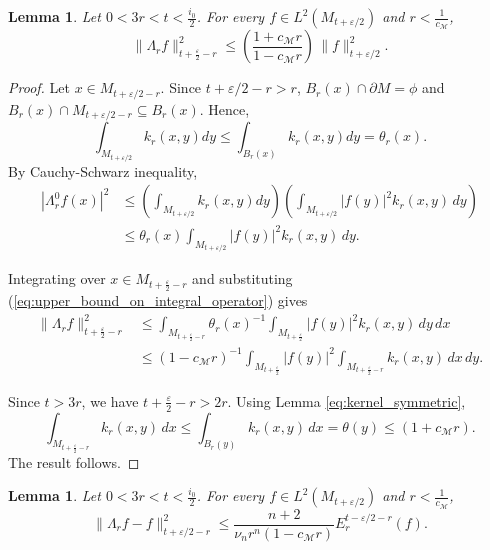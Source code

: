 \documentclass[10 pt, reqno]{amsart}
\newcommand{\M}{\mathcal{M}}
\newtheorem{lemma}[theorem]{Lemma}
\theoremstyle{definition}
\numberwithin{equation}{section}
\newcommand{\MMM}{\mathcal{M}}
\newcommand{\lbtheta}{(1-c_\MMM r)}
\begin{document}
\begin{lemma}\label{lem:L2-stability-Mrho}
Let $0<3r<t<\frac{i_0}{2}$. For every $f\in L^2(M_{t+\varepsilon/2})$ and $r<\frac{1}{c_\M}$,
\[
\|\Lambda_r f\|^2_{t+\frac{\varepsilon}{2}-r}
\le
\left( \frac{1+c_\MMM r}{1-c_\MMM r}\right)\,\|f\|^2_{t+\varepsilon/2}.
\]
\end{lemma}
\begin{proof}
Let $x\in M_{t+\varepsilon/2-r}.$ Since $t+\varepsilon/2-r>r$, $B_r(x)\cap \partial M=\phi$ and $B_r(x)\cap M_{t+\varepsilon/2-r}\subseteq B_r(x).$ Hence,
\[\int_{M_{t+\varepsilon/2}}k_r(x,y)dy\le \int_{B_r(x)}k_r(x,y)dy=\theta_r(x).\]
By Cauchy-Schwarz inequality,
\begin{align} 
|\Lambda^0_r f(x)|^2 &\le \left(\int_{M_{t+\varepsilon/2}}k_r(x,y)dy\right)\left(\int_{M_{t+\varepsilon/2}} |f(y)|^2 k_r(x,y)\,dy\right)\nonumber\\ &\le\theta_r(x)\int_{M_{t+\varepsilon/2}} |f(y)|^2 k_r(x,y)\,dy.\label{eq:upper_bound_on_integral_operator}
\end{align}

Integrating over $x\in M_{t+\frac{\varepsilon}{2}-r}$  and substituting (\ref{eq:upper_bound_on_integral_operator}) gives
\begin{align}
  \|\Lambda_r f\|_{t+\frac{\varepsilon}{2}-r}^2
&\le \int_{M_{t+\frac{\varepsilon}{2}-r}}\theta_r(x)^{-1}
\int_{M_{t+\frac{\varepsilon}{2}}}|f(y)|^2
k_r(x,y)\,dy\,dx \nonumber\\ 
&\le (1-c_\M r)^{-1}\int_{M_{t+\frac{\varepsilon}{2}}}|f(y)|^2
\int_{M_{t+\frac{\varepsilon}{2}-r}}
k_r(x,y)\,dx\,dy.\nonumber  
\end{align}

Since $t>3r$, we have $t+\frac{\varepsilon}{2}-r>2r$. Using Lemma \ref{eq:kernel_symmetric}, 
\[
\int_{M_{t+\frac{\varepsilon}{2}-r}}
k_r(x,y)\,dx\le \int_{B_r(y)}
k_r(x,y)\,dx=\theta(y)\le (1+c_\M r).
\]
The result follows.
\end{proof}
\begin{lemma}\label{lem:smoothing-error-Mrho}
Let $0<3r<t<\frac{i_0}{2}$. For every $f\in L^2(M_{t+\varepsilon/2})$ and $r<\frac{1}{c_\M}$,
\[
\|\Lambda_r f - f\|_{t+\varepsilon/2-r}^2
\le
\frac{n+2}{\nu_nr^{n}\lbtheta }
E_r^{t-\varepsilon/2-r}(f).
\]
\end{lemma}
\end{document}
